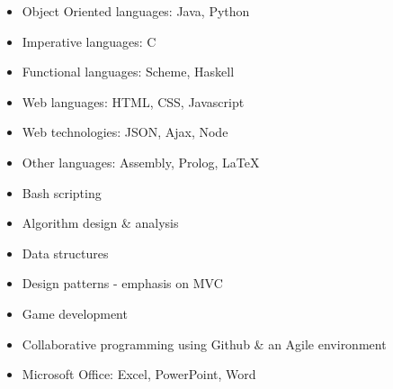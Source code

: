 \documentclass[]{friggeri-cv} %
\begin{document}
\begin{minipage}[t]{0.5\textwidth}
\begin{itemize}
\item{Object Oriented languages: Java, Python}
\item{Imperative languages: C}
\item{Functional languages: Scheme, Haskell}
\item{Web languages: HTML, CSS, Javascript}
\item{Web technologies: JSON, Ajax, Node}
\item{Other languages: Assembly, Prolog, \LaTeX}
\item{Bash scripting}
\end{itemize}
\end{minipage}
\begin{minipage}[t]{0.5\textwidth}
\begin{itemize}
\item{Algorithm design \& analysis}
\item{Data structures}
\item{Design patterns - emphasis on MVC}
\item{Game development}
\item{Collaborative programming using Github \& an Agile environment}
\item{Microsoft Office: Excel, PowerPoint, Word}
\end{itemize}
\end{minipage}
\vspace{0.4em}

\end{document}

